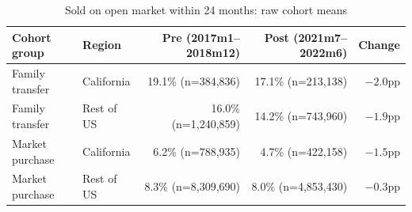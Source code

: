 \begin{table}[!ht]\centering
\caption{Sold on open market within 24 months: raw cohort means}
\label{tab:raw22}
{\small
\begin{tabular}{llrrr}
\toprule
Cohort group & Region & Pre (2017m1--2018m12) & Post (2021m7--2022m6) & Change \\
\midrule
Family transfer & California & 19.1\% \; (n=384{,}836) & 17.1\% \; (n=213{,}138) & $-2.0$pp \\
Family transfer & Rest of US & 16.0\% \; (n=1{,}240{,}859) & 14.2\% \; (n=743{,}960) & $-1.9$pp \\
Market purchase & California & 6.2\% \; (n=788{,}935) & 4.7\% \; (n=422{,}158) & $-1.5$pp \\
Market purchase & Rest of US & 8.3\% \; (n=8{,}309{,}690) & 8.0\% \; (n=4{,}853{,}430) & $-0.3$pp \\
\bottomrule
\end{tabular}}
\begin{minipage}{0.95\textwidth}\end{minipage}
\end{table}
